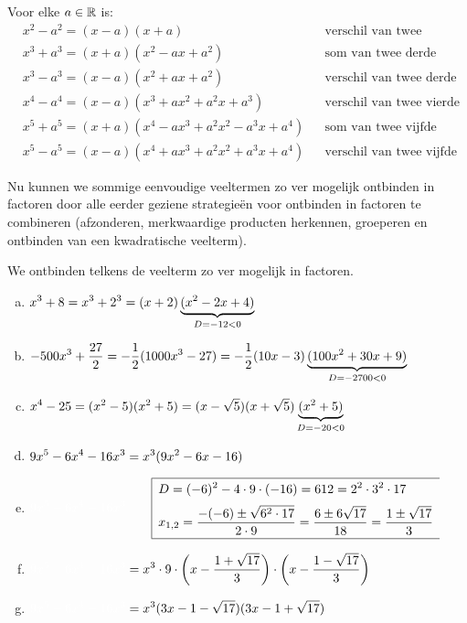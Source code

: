 \documentclass{ximera}
\begin{document}
\begin{eigenschap}
Voor elke $a \in \mathbb{R}$ is:
\begin{align*}
& x^2 - a^2 = (x-a)(x+a) && \text{verschil van twee kwadraten} \\
& x^3 + a^3 = (x+a)(x^2 - ax + a^2) && \text{som van twee derde machten} \\
& x^3 - a^3 = (x-a)(x^2 + ax + a^2) && \text{verschil van twee derde machten} \\
& x^4 - a^4 = (x-a)(x^3 + ax^2 + a^2x + a^3) && \text{verschil van twee vierde machten} \\
& x^5 + a^5 = (x+a)(x^4 - ax^3 + a^2x^2 - a^3x + a^4) && \text{som van twee vijfde machten} \\
& x^5 - a^5 = (x-a)(x^4 + ax^3 + a^2x^2 + a^3x + a^4) && \text{verschil van twee vijfde machten.}
\end{align*}
\end{eigenschap}

\clearpage

Nu kunnen we sommige eenvoudige veeltermen zo ver mogelijk ontbinden in factoren door alle eerder geziene strategie\"en voor ontbinden in factoren te combineren (afzonderen, merkwaardige producten herkennen, groeperen en ontbinden van een kwadratische veelterm).

\begin{voorbeeld}
We ontbinden telkens de veelterm zo ver mogelijk in factoren. 
\begin{enumerate}[(a)]
\item 
$\displaystyle x^3 + 8 = x^3 + 2^3 = (x+2)\underbrace{(x^2-2x+4)}_{D = -12 < 0}$
\item
$\displaystyle -500x^3 + \frac{27}{2} = -\frac{1}{2}(1000x^3 - 27) = -\frac{1}{2}(10x-3)\underbrace{(100x^2 + 30x + 9)}_{D = -2700 < 0}$
\item
$\displaystyle x^4-25 = (x^2 - 5)(x^2+5) = (x-\sqrt{5})(x+\sqrt{5})\underbrace{(x^2+5)}_{D = -20 < 0}$
\item
$\displaystyle 9x^5 - 6x^4 - 16x^3 = x^3(9x^2-6x-16)$ 
\item[]
$\D \mph{9x^5 - 6x^4 - 16x^3} \qquad 
\begin{array}{|l}
\hline
\begin{aligned}
\vrule height 0.4cm width 0cm
& D = (-6)^2-4\cdot 9 \cdot (-16) = 612 = 2^2 \cdot 3^2 \cdot 17 \\[0.1cm] 
& x_{1,2} = \frac{-(-6) \pm \sqrt{6^2 \cdot 17}}{2 \cdot 9} = \frac{6 \pm 6\sqrt{17}}{18} = \frac{1 \pm \sqrt{17}}{3} \\[0.1cm] 
\end{aligned} \\
\hline
\end{array}
$
\item[]
$\D \mph{9x^5 - 6x^4 - 16x^3} = x^3 \cdot 9 \cdot \left(x-\frac{1+\sqrt{17}}{3}\right)\cdot\left(x-\frac{1-\sqrt{17}}{3}\right)$
\item[]
$\D \mph{9x^5 - 6x^4 - 16x^3} = x^3(3x-1-\sqrt{17})(3x-1+\sqrt{17})$
\end{enumerate}
\end{voorbeeld}
\end{document}
